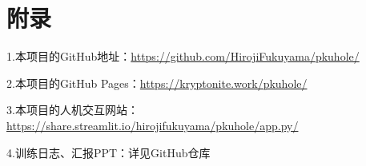 \documentclass[12pt,a4paper]{article}
\begin{document}
\section*{附录}

\noindent 1.本项目的GitHub地址：\href{https://github.com/HirojiFukuyama/pkuhole/}{https://github.com/HirojiFukuyama/pkuhole/}

\noindent 2.本项目的GitHub Pages：\href{https://kryptonite.work/pkuhole/}{https://kryptonite.work/pkuhole/}

\noindent 3.本项目的人机交互网站：\href{https://share.streamlit.io/hirojifukuyama/pkuhole/app.py/}{https://share.streamlit.io/hirojifukuyama/pkuhole/app.py/}

\noindent 4.训练日志、汇报PPT：详见GitHub仓库
\end{document}
